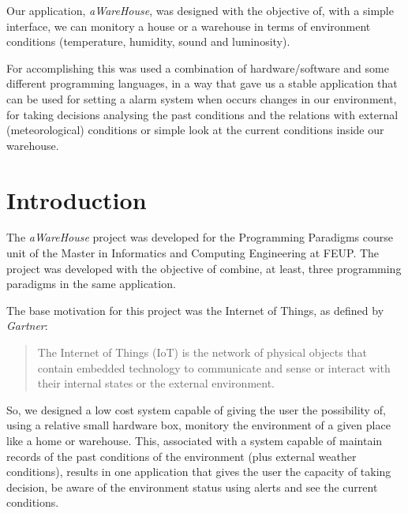\documentclass[12pt]{article}
\begin{document}
Our application, \textit{aWareHouse}, was designed with the objective of, with a simple interface, we can monitory a house or a warehouse in terms of environment conditions (temperature, humidity, sound and luminosity). 

For accomplishing this was used a combination of hardware/software and some different programming languages, in a way that gave us a stable application that can be used for setting a alarm system when occurs changes in our environment, for taking decisions analysing the past conditions and the relations with external (meteorological) conditions or simple look at the current conditions inside our warehouse.


\newpage
\tableofcontents
\newpage

\section{Introduction}

The \textit{aWareHouse} project was developed for the Programming Paradigms course unit of the Master in Informatics and Computing Engineering at FEUP. The project was developed with the objective of combine, at least, three programming paradigms in the same application.

The base motivation for this project was the Internet of Things, as defined by \textit{Gartner}:

\blockquote{The Internet of Things (IoT) is the network of physical objects that contain embedded technology to communicate and sense or interact with their internal states or the external environment.}

So, we designed a low cost system capable of giving the user the possibility of, using a relative small hardware box, monitory the environment of a given place like a home or warehouse. This, associated with a system capable of maintain records of the past conditions of the environment (plus external weather conditions), results in one application that gives the user the capacity of taking decision, be aware of the environment status using alerts and see the current conditions.
\end{document}

